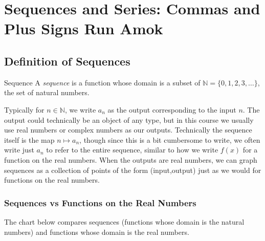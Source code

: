
 \chapter{Sequences and Series: Commas and Plus Signs Run Amok}
 
\section{Definition of Sequences} 
\begin{definition}{Sequence}
A \emph{sequence} is a function whose domain is a subset of $\mathbb{N}=\lbrace 0,1,2,3, \ldots \rbrace $, the set of natural numbers.
\end{definition}  

Typically for $n \in \mathbb{N}$, we write $a_n$ as the output corresponding to the input $n$.  The output could technically be an object of any type, but in this course we usually use real numbers or complex numbers as our outputs.  Technically the sequence itself is the map $n \mapsto a_n$, though since this is a bit cumbersome to write, we often write just $a_n$ to refer to the entire sequence, similar to how we write $f(x)$ for a function on the real numbers. When the outputs are real numbers, we can graph sequences as a collection of points of the form (input,output) just as we would for functions on the real numbers.

\subsection{Sequences vs Functions on the Real Numbers}

The chart below compares sequences (functions whose domain is the natural numbers) and functions whose domain is the real numbers.

